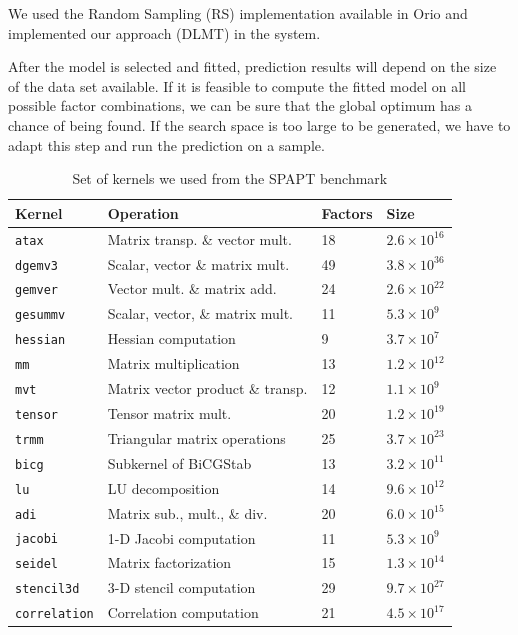 \documentclass[conference]{IEEEtran}
\begin{document}
We used the Random Sampling (RS) implementation available in Orio and
implemented our approach (DLMT) in the system.

\todo{!}After the model is selected and fitted, prediction results will depend
on the size of the data set available. If it is feasible to compute the fitted
model on all possible factor combinations, we can be sure that the global
optimum has a chance of being found. If the search space is too large to be
generated, we have to adapt this step and run the prediction on a sample.

\begin{table}[ht]
\caption{\label{tab:org97d1f8a}
Set of kernels we used from the SPAPT benchmark}
\centering
\scriptsize
\begin{tabular}{llll}
\toprule
Kernel & Operation & Factors & Size\\
\midrule
\texttt{atax} & Matrix transp. \& vector mult. & 18 & \(2.6 \times 10^{16}\)\\
\texttt{dgemv3} & Scalar, vector \& matrix mult. & 49 & \(3.8 \times 10^{36}\)\\
\texttt{gemver} & Vector mult. \& matrix add. & 24 & \(2.6 \times 10^{22}\)\\
\texttt{gesummv} & Scalar, vector, \& matrix mult. & 11 & \(5.3 \times 10^{9}\)\\
\texttt{hessian} & Hessian computation & 9 & \(3.7 \times 10^{7}\)\\
\texttt{mm} & Matrix multiplication & 13 & \(1.2 \times 10^{12}\)\\
\texttt{mvt} & Matrix vector product \& transp. & 12 & \(1.1 \times 10^{9}\)\\
\texttt{tensor} & Tensor matrix mult. & 20 & \(1.2 \times 10^{19}\)\\
\texttt{trmm} & Triangular matrix operations & 25 & \(3.7 \times 10^{23}\)\\
\texttt{bicg} & Subkernel of BiCGStab & 13 & \(3.2 \times 10^{11}\)\\
\texttt{lu} & LU decomposition & 14 & \(9.6 \times 10^{12}\)\\
\texttt{adi} & Matrix sub., mult., \& div. & 20 & \(6.0 \times 10^{15}\)\\
\texttt{jacobi} & 1-D Jacobi computation & 11 & \(5.3 \times 10^{9}\)\\
\texttt{seidel} & Matrix factorization & 15 & \(1.3 \times 10^{14}\)\\
\texttt{stencil3d} & 3-D stencil computation & 29 & \(9.7 \times 10^{27}\)\\
\texttt{correlation} & Correlation computation & 21 & \(4.5 \times 10^{17}\)\\
\bottomrule
\end{tabular}
\end{table}
\end{document}

